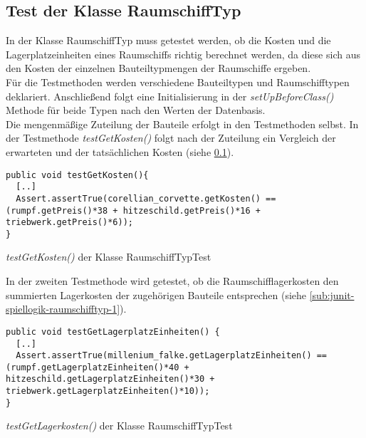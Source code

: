 \subsection{Test der Klasse RaumschiffTyp}
\label{sub:junit-spiellogik-raumschifftyp}  

In der Klasse RaumschiffTyp muss getestet werden, ob die Kosten und die Lagerplatzeinheiten eines Raumschiffs richtig berechnet werden, da diese sich aus den Kosten der einzelnen Bauteiltypmengen der Raumschiffe ergeben.
\\
Für die Testmethoden werden verschiedene Bauteiltypen und Raumschifftypen deklariert. Anschließend folgt eine Initialisierung in der \textit{setUpBeforeClass()} Methode für beide Typen nach den Werten der Datenbasis.
\\
Die mengenmäßige Zuteilung der Bauteile erfolgt in den Testmethoden selbst. In der Testmethode \textit{testGetKosten()} folgt nach der Zuteilung ein Vergleich der erwarteten und der tatsächlichen Kosten (siehe \ref{sub:junit-spiellogik-raumschifftyp}).

\begin{programm}[ht]
\begin{lstlisting}[breaklines=true]
public void testGetKosten(){
  [..]
  Assert.assertTrue(corellian_corvette.getKosten() == (rumpf.getPreis()*38 + hitzeschild.getPreis()*16 + triebwerk.getPreis()*6));
}
\end{lstlisting}
\caption{\textit{testGetKosten()} der Klasse RaumschiffTypTest\label{sub:junit-spiellogik-raumschifftyp}}
\end{programm}

In der zweiten Testmethode wird getestet, ob die Raumschifflagerkosten den summierten Lagerkosten der zugehörigen Bauteile entsprechen (siehe \ref{sub:junit-spiellogik-raumschifftyp-1}).
 
\begin{programm}[ht]
\begin{lstlisting}[breaklines=true]
public void testGetLagerplatzEinheiten() {
  [..]
  Assert.assertTrue(millenium_falke.getLagerplatzEinheiten() == (rumpf.getLagerplatzEinheiten()*40 + hitzeschild.getLagerplatzEinheiten()*30 + triebwerk.getLagerplatzEinheiten()*10));
}
\end{lstlisting}
\caption{\textit{testGetLagerkosten()} der Klasse RaumschiffTypTest\label{sub:junit-spiellogik-raumschifftyp-1}}
\end{programm}

